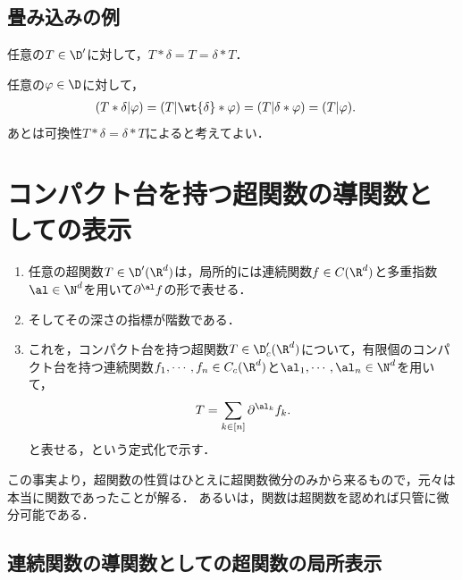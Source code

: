 \documentclass[uplatex,dvipdfmx]{jsreport}
\begin{document}
\subsection{畳み込みの例}

\begin{proposition}
    任意の$T\in\D'$に対して，$T*\delta=T=\delta*T$．
\end{proposition}
\begin{Proof}
    任意の$\varphi\in\D$に対して，
    \begin{align*}
        (T*\delta|\varphi)&=(T|\wt{\delta}*\varphi)=(T|\delta*\varphi)=(T|\varphi).
    \end{align*}
    あとは可換性$T*\delta=\delta*T$によると考えてよい．
\end{Proof}

\section{コンパクト台を持つ超関数の導関数としての表示}

\begin{tcolorbox}[colframe=ForestGreen, colback=ForestGreen!10!white,breakable,colbacktitle=ForestGreen!40!white,coltitle=black,fonttitle=\bfseries\sffamily,
title=]
    \begin{enumerate}
        \item 任意の超関数$T\in\D'(\R^d)$は，局所的には連続関数$f\in C(\R^d)$と多重指数$\al\in\N^d$を用いて$\partial^\al f$の形で表せる．
        \item そしてその深さの指標が階数である．
        \item これを，コンパクト台を持つ超関数$T\in\D'_c(\R^d)$について，有限個のコンパクト台を持つ連続関数$f_1,\cdots,f_n\in C_c(\R^d)$と$\al_1,\cdots,\al_n\in\N^d$を用いて，
        \[T=\sum_{k\in[n]}\partial^{\al_k}f_k.\]
        と表せる，という定式化で示す．
    \end{enumerate}
\end{tcolorbox}

\begin{remarks}[本質は超関数微分にあり]
    この事実より，超関数の性質はひとえに超関数微分のみから来るもので，元々は本当に関数であったことが解る．
    あるいは，関数は超関数を認めれば只管に微分可能である．
\end{remarks}

\subsection{連続関数の導関数としての超関数の局所表示}
\end{document}
